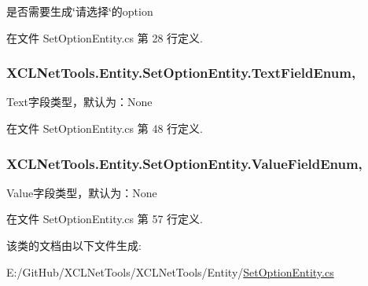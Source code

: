 是否需要生成\char`\"{}请选择\char`\"{}的option 



在文件 Set\+Option\+Entity.\+cs 第 28 行定义.

\subsubsection[{\texorpdfstring{Text\+Field\+Enum}{TextFieldEnum}}]{ X\+C\+L\+Net\+Tools.\+Entity.\+Set\+Option\+Entity.\+Text\+Field\+Enum\hspace{0.3cm}{\ttfamily [get]}, {\ttfamily [set]}}\hypertarget{class_x_c_l_net_tools_1_1_entity_1_1_set_option_entity_a73ab171debc846e282a87565cf7baf96}{}\label{class_x_c_l_net_tools_1_1_entity_1_1_set_option_entity_a73ab171debc846e282a87565cf7baf96}


Text字段类型，默认为：\+None 



在文件 Set\+Option\+Entity.\+cs 第 48 行定义.

\subsubsection[{\texorpdfstring{Value\+Field\+Enum}{ValueFieldEnum}}]{ X\+C\+L\+Net\+Tools.\+Entity.\+Set\+Option\+Entity.\+Value\+Field\+Enum\hspace{0.3cm}{\ttfamily [get]}, {\ttfamily [set]}}\hypertarget{class_x_c_l_net_tools_1_1_entity_1_1_set_option_entity_a3f5eebe69ef0bc0e2c184f9d8d65fbaf}{}\label{class_x_c_l_net_tools_1_1_entity_1_1_set_option_entity_a3f5eebe69ef0bc0e2c184f9d8d65fbaf}


Value字段类型，默认为：\+None 



在文件 Set\+Option\+Entity.\+cs 第 57 行定义.



该类的文档由以下文件生成\+:\begin{DoxyCompactItemize}
\item 
E\+:/\+Git\+Hub/\+X\+C\+L\+Net\+Tools/\+X\+C\+L\+Net\+Tools/\+Entity/\hyperlink{_set_option_entity_8cs}{Set\+Option\+Entity.\+cs}\end{DoxyCompactItemize}
